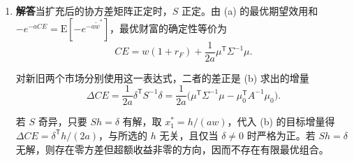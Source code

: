 \begin{solution}[blank-type=manual,blank-vsep=11\baselineskip]
\begin{enumerate}[label=(\alph*)]
 若扩充协方差矩阵正定，则任一非零的新证券头寸在对冲后仍有正方差，所以 $S$ 正定。对 $x_1$ 的一阶条件 $awSx_1^*=\delta$ 给出
 \[
 x_1^*=\frac1{aw}S^{-1}\delta.
 \]

 此时 $x_1^*\ne0$ 等价于 $\delta\ne0$。由一阶条件 $\delta=awSx_1^*$，增量目标的线性项等于 $aw^2{x_1^*}^{\mathsf T}Sx_1^*$，恰好是方差惩罚的两倍。两项相减再代入最优权重，得到
 \[
 \Delta CE=\frac{aw^2}{2}{x_1^*}^{\mathsf T}Sx_1^*
 =\frac{1}{2a}\delta^{\mathsf T}S^{-1}\delta.
 \]
 由 $S$ 正定，增量在且仅在 $\delta\ne0$ 时为正，确定性等价与期望效用都严格提高。

 原题的不可生成条件仍允许新证券彼此冗余。例如新增两只收益完全相同的证券，收益与旧资产独立且超额收益均值为零。最优的新证券净头寸为零，但一买一卖也能构成含新证券的最优组合，福利不变。

 \item \textbf{解答}\quad 当扩充后的协方差矩阵正定时，$S$ 正定。由 (a) 的最优期望效用和 $-e^{-aCE}=\mathrm E[-e^{-a\tilde w^*}]$，最优财富的确定性等价为
 \[
 CE=w(1+r_F)+\frac1{2a}\mu^{\mathsf T}\Sigma^{-1}\mu.
 \]

 对新旧两个市场分别使用这一表达式，二者的差正是 (b) 求出的增量
 \[
 \Delta CE=\frac1{2a}\delta^{\mathsf T}S^{-1}\delta
 =\frac1{2a}\bigl(\mu^{\mathsf T}\Sigma^{-1}\mu
       -\mu_0^{\mathsf T}A^{-1}\mu_0\bigr).
 \]

 若 $S$ 奇异，只要 $Sh=\delta$ 有解，取 $x_1^*=h/(aw)$，代入 (b) 的目标增量得 $\Delta CE=\delta^{\mathsf T}h/(2a)$，与所选的 $h$ 无关，且仅当 $\delta\ne0$ 时严格为正。若 $Sh=\delta$ 无解，则存在零方差但超额收益非零的方向，因而不存在有限最优组合。
\end{enumerate}
\end{solution}

